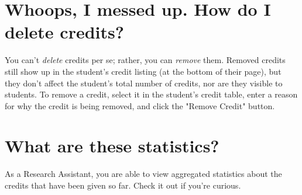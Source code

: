\documentclass[letterpaper]{article}
\begin{document}
\section{Whoops, I messed up. How do I delete credits?}
You can't {\it delete} credits per se; rather, you can {\it remove} them. Removed credits still show up in the student's credit listing (at the bottom of their page), but they don't affect the student's total number of credits, nor are they visible to students. To remove a credit, select it in the student's credit table, enter a reason for why the credit is being removed, and click the "Remove Credit" button.

\section{What are these statistics?}
As a Research Assistant, you are able to view aggregated statistics about the credits that have been given so far. Check it out if you're curious.
\end{document}
